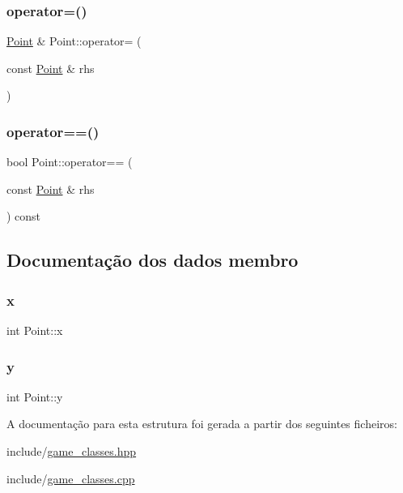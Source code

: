 \subsubsection{\texorpdfstring{operator=()}{operator=()}}
{\footnotesize\ttfamily \hyperlink{structPoint}{Point} \& Point\+::operator= (\begin{DoxyParamCaption}\item[{const \hyperlink{structPoint}{Point} \&}]{rhs }\end{DoxyParamCaption})}

\mbox{\label{structPoint_a0c0525e4a539e462236840739cd81495}} 
\subsubsection{\texorpdfstring{operator==()}{operator==()}}
{\footnotesize\ttfamily bool Point\+::operator== (\begin{DoxyParamCaption}\item[{const \hyperlink{structPoint}{Point} \&}]{rhs }\end{DoxyParamCaption}) const}



\subsection{Documentação dos dados membro}
\mbox{\label{structPoint_a8c779e11e694b20e0946105a9f5de842}} 
\subsubsection{\texorpdfstring{x}{x}}
{\footnotesize\ttfamily int Point\+::x}

\mbox{\label{structPoint_a2e1b5fb2b2a83571f5c0bc0f66a73cf7}} 
\subsubsection{\texorpdfstring{y}{y}}
{\footnotesize\ttfamily int Point\+::y}



A documentação para esta estrutura foi gerada a partir dos seguintes ficheiros\+:\begin{DoxyCompactItemize}
\item 
include/\hyperlink{game__classes_8hpp}{game\+\_\+classes.\+hpp}\item 
include/\hyperlink{game__classes_8cpp}{game\+\_\+classes.\+cpp}\end{DoxyCompactItemize}
